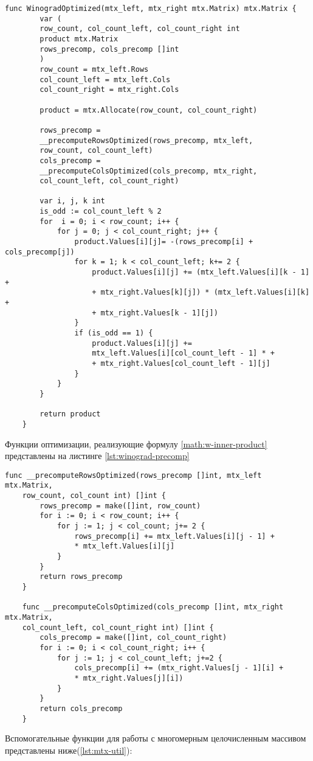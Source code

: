 \begin{lstlisting}[label=lst:winograd-optimized,caption=Оптимизированный алгоритм умнложения Виноградом]
	func WinogradOptimized(mtx_left, mtx_right mtx.Matrix) mtx.Matrix {
		var (
		row_count, col_count_left, col_count_right int
		product mtx.Matrix
		rows_precomp, cols_precomp []int
		)
		row_count = mtx_left.Rows
		col_count_left = mtx_left.Cols
		col_count_right = mtx_right.Cols
		
		product = mtx.Allocate(row_count, col_count_right)
		
		rows_precomp = 
		__precomputeRowsOptimized(rows_precomp, mtx_left,
		row_count, col_count_left)
		cols_precomp =
		__precomputeColsOptimized(cols_precomp, mtx_right,
		col_count_left, col_count_right)
		
		var i, j, k int
		is_odd := col_count_left % 2
		for  i = 0; i < row_count; i++ {
			for j = 0; j < col_count_right; j++ {
				product.Values[i][j]= -(rows_precomp[i] + cols_precomp[j])
				for k = 1; k < col_count_left; k+= 2 {
					product.Values[i][j] += (mtx_left.Values[i][k - 1] +
					+ mtx_right.Values[k][j]) * (mtx_left.Values[i][k] + 
					+ mtx_right.Values[k - 1][j])
				}
				if (is_odd == 1) {
					product.Values[i][j] += 
					mtx_left.Values[i][col_count_left - 1] * +
					+ mtx_right.Values[col_count_left - 1][j]
				}
			}
		}
		
		return product
	}
\end{lstlisting}
Функции оптимизации, реализующие формулу \ref{math:w-inner-product} представлены на листинге \ref{lst:winograd-precomp}
\begin{lstlisting}[label=lst:winograd-precomp,caption=Функции препроцессирования для алгоримов Винограда]
	func __precomputeRowsOptimized(rows_precomp []int, mtx_left mtx.Matrix,
	row_count, col_count int) []int {
		rows_precomp = make([]int, row_count)
		for i := 0; i < row_count; i++ {
			for j := 1; j < col_count; j+= 2 {
				rows_precomp[i] += mtx_left.Values[i][j - 1] +
				* mtx_left.Values[i][j]
			}
		}
		return rows_precomp
	}
	
	func __precomputeColsOptimized(cols_precomp []int, mtx_right mtx.Matrix,
	col_count_left, col_count_right int) []int {
		cols_precomp = make([]int, col_count_right)
		for i := 0; i < col_count_right; i++ {
			for j := 1; j < col_count_left; j+=2 {
				cols_precomp[i] += (mtx_right.Values[j - 1][i] +
				* mtx_right.Values[j][i])
			}
		}
		return cols_precomp
	}
\end{lstlisting}

Вспомогательные функции для работы с многомерным целочисленным массивом представлены ниже(\ref{lst:mtx-util}):

